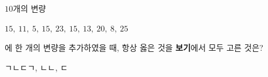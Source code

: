 $10$개의 변량\par{\centering $15,\ 11,\ 5,\ 15,\ 23,\ 15,\ 13,\ 20,\ 8,\ 25$\par}\noindent 에 한 개의 변량을 추가하였을 때, 항상 옳은 것을 \textbf{보기}에서 모두 고른 것은? 
\begin{choices32}{ㄱ}{ㄴ}{ㄷ}{ㄱ, ㄴ}{ㄴ, ㄷ}\end{choices32}
